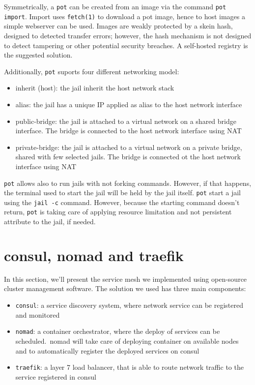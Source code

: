 \documentclass[conference,a4paper,11pt]{IEEEtran}
\begin{document}
Symmetrically, a \texttt{pot} can be created from an image via the command \texttt{pot import}. Import uses \texttt{fetch(1)} to download a pot image, hence to host images a simple webserver can be used. Images are weakly protected by a skein hash, designed to detected transfer errors; however, the hash mechanism is not designed to detect tampering or other potential security breaches. A self-hosted registry is the suggested solution.

Additionally, \texttt{pot} suports four different networking model:
\begin{itemize}
	\item inherit (host): the jail inherit the host network stack
	\item alias: the jail has a unique IP applied as alias to the host network interface
	\item public-bridge: the jail is attached to a virtual network on a shared bridge interface. The bridge is connected to the host network interface using NAT
	\item private-bridge: the jail is attached to a virtual network on a private bridge, shared with few selected jails. The bridge is connected ot the host network interface using NAT
\end{itemize}

\texttt{pot} allows also to run jails with not forking commands. However, if that happens, the terminal used to start the jail will be held by the jail itself. \texttt{pot} start a jail using the \texttt{jail -c} command. However, because the starting command doesn't return, \texttt{pot} is taking care of applying resource limitation and not persistent attribute to the jail, if needed.

\section{consul, nomad and traefik}\label{sec:ServiceMesh}
In this section, we’ll present the service mesh we implemented using open-source cluster management software. The solution we used has three main components:
\begin{itemize}
	\item \texttt{consul}: a service discovery system, where network service can be registered and monitored~\cite{consul}
	\item \texttt{nomad}: a container orchestrator, where the deploy of services can be scheduled.\ nomad will take care of deploying container on available nodes and to automatically register the deployed services on consul~\cite{nomad}
	\item \texttt{traefik}: a layer 7 load balancer, that is able to route network traffic to the service registered in consul~\cite{traefik}
\end{itemize}
\end{document}
